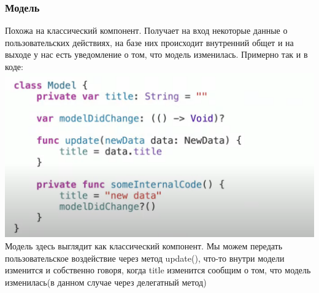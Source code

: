 \documentclass{article}
\begin{document}
    \subsubsection{Модель}
    Похожа на классический компонент. Получает на вход некоторые данные о пользовательских действиях, на базе них происходит внутренний общет и на выходе у нас есть уведомление о том, что модель изменилась. Примерно так и в коде: 
    \newline
    \includegraphics[scale = 0.3]{pic/Снимок экрана 2023-07-30 в 18.52.36.png}
    \newline
    Модель здесь выглядит как классический компонент. Мы можем передать пользовательское воздействие через метод update(), что-то внутри модели изменится и собственно говоря, когда title изменится сообщим о том, что модель изменилась(в данном случае через делегатный метод)
\end{document}
